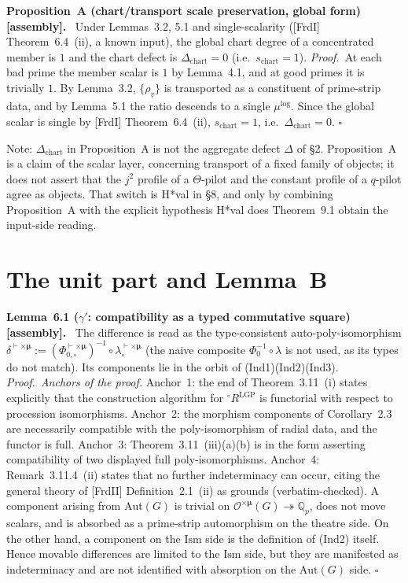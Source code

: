 \documentclass[11pt]{article}
\newcommand{\cO}{\mathcal O}
\newcommand{\stmt}[2]{\medskip\noindent\textbf{#1\ #2.}\ }
\newcommand{\pf}{\medskip\noindent\textit{Proof.}\ }
\newcommand{\qedh}{\hfill\(\square\)\par\medskip}
\begin{document}
\stmt{Proposition}{A (chart/transport scale preservation, global form) [assembly]}
Under Lemmas~3.2, 5.1 and single-scalarity ([FrdI] Theorem~6.4~(ii),
a known input), the global chart degree of a concentrated member is
$1$ and the chart defect is $\Delta_{\mathrm{chart}}=0$ (i.e.\
$s_{\mathrm{chart}}=1$).
\pf At each bad prime the member scalar is $1$ by Lemma~4.1, and at
good primes it is trivially $1$.  By Lemma~3.2,
$\{\rho_{\underline v}\}$ is transported as a constituent of
prime-strip data, and by Lemma~5.1 the ratio descends to a single
$\mu^{\log}$.  Since the global scalar is single by [FrdI]
Theorem~6.4~(ii), $s_{\mathrm{chart}}=1$, i.e.\
$\Delta_{\mathrm{chart}}=0$. \qedh

Note: $\Delta_{\mathrm{chart}}$ in Proposition~A is not the
aggregate defect $\Delta$ of \S2.  Proposition~A is a claim of the
scalar layer, concerning transport of a fixed family of objects; it
does not assert that the $j^2$ profile of a $\Theta$-pilot and the
constant profile of a $q$-pilot agree as objects.  That switch is
H*val in \S8, and only by combining Proposition~A with the explicit
hypothesis H*val does Theorem~9.1 obtain the input-side reading.

\section{The unit part and Lemma~B}

\stmt{Lemma}{6.1 ($\gamma'$: compatibility as a typed commutative square) [assembly]}
The difference is read as the type-consistent auto-poly-isomorphism
$\delta^{\vdash\times\boldsymbol\mu}
:=(\Phi^{\vdash\times\boldsymbol\mu}_{0,\circ})^{-1}\circ
\lambda^{\vdash\times\boldsymbol\mu}_{\circ}$ (the naive composite
$\Phi_0^{-1}\circ\lambda$ is not used, as its types do not match).
Its components lie in the orbit of (Ind1)(Ind2)(Ind3).
\pf \textit{Anchors of the proof.}  Anchor~1: the end of
Theorem~3.11~(i) states explicitly that the construction algorithm
for ${}^{\circ}R^{\mathrm{LGP}}$ is functorial with respect to
procession isomorphisms.  Anchor~2: the morphism components of
Corollary~2.3 are necessarily compatible with the poly-isomorphism
of radial data, and the functor is full.  Anchor~3:
Theorem~3.11~(iii)(a)(b) is in the form asserting compatibility of
two displayed full poly-isomorphisms.  Anchor~4:
Remark~3.11.4~(ii) states that no further indeterminacy can occur,
citing the general theory of [FrdII] Definition~2.1~(ii) as grounds
(verbatim-checked).  A component arising from $\mathrm{Aut}(G)$ is
trivial on $\cO^{\times\boldsymbol\mu}(G)\twoheadrightarrow\mathbb
Q_p$, does not move scalars, and is absorbed as a prime-strip
automorphism on the theatre side.  On the other hand, a component
on the $\mathrm{Ism}$ side is the definition of (Ind2) itself.
Hence movable differences are limited to the $\mathrm{Ism}$ side,
but they are manifested as indeterminacy and are not identified
with absorption on the $\mathrm{Aut}(G)$ side. \qedh
\end{document}
